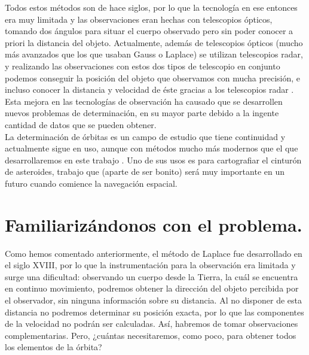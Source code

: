 Todos estos métodos son de hace siglos, por lo que la tecnología en ese entonces era muy limitada y las observaciones eran hechas con telescopios ópticos, tomando dos ángulos para situar el cuerpo observado pero sin poder conocer a priori la distancia del objeto. Actualmente, además de telescopios ópticos (mucho más avanzados que los que usaban Gauss o Laplace) se utilizan telescopios radar, y realizando las observaciones con estos dos tipos de telescopio en conjunto podemos conseguir la posición del objeto que observamos con mucha precisión, e incluso conocer la distancia y velocidad de éste gracias a los telescopios radar \cite{brett_r_wilson} \cite{vetter}. Esta mejora en las tecnologías de observación ha causado que se desarrollen nuevos problemas de determinación, en su mayor parte debido a la ingente cantidad de datos que se pueden obtener. \cite{gronchi}\\

La determinación de órbitas es un campo de estudio que tiene continuidad y actualmente sigue en uso, aunque con métodos mucho más modernos que el que desarrollaremos en este trabajo \cite{gronchi_unesco}. Uno de sus usos es para cartografiar el cinturón de asteroides, trabajo que (aparte de ser bonito) será muy importante en un futuro cuando comience la navegación espacial.\\


\section{Familiarizándonos con el problema.}
Como hemos comentado anteriormente, el método de Laplace fue desarrollado en el siglo XVIII, por lo que la instrumentación para la observación era limitada y surge una dificultad: observando un cuerpo desde la Tierra, la cuál se encuentra en continuo movimiento, podremos obtener la dirección del objeto percibida por el observador, sin ninguna información sobre su distancia. Al no disponer de esta distancia no podremos determinar su posición exacta, por lo que las componentes de la velocidad no podrán ser calculadas. Así, habremos de tomar observaciones complementarias. Pero, ¿cuántas necesitaremos, como poco, para obtener todos los elementos de la órbita?\\

